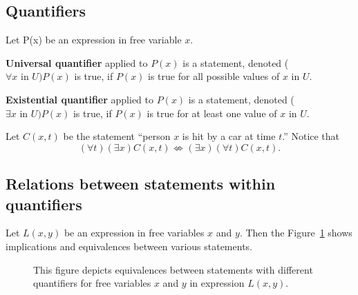 \documentclass[]{article}
\begin{document}
\subsection{Quantifiers}
Let P(x) be an expression in free variable $x$.
\begin{defn} \textbf{Universal quantifier} applied to $P(x)$ is a statement, denoted ($\forall x \text{ in } U)P(x)$ is true, if $P(x)$ is true for all possible values of $x$ in $U$.
\end{defn}
\begin{defn} \textbf{Existential quantifier} applied to $P(x)$ is a statement, denoted ($\exists x \text{ in }U)P(x)$ is true, if $P(x)$ is true for at least one value of $x$ in $U$.
\end{defn}
\begin{exmp} Let $C(x,t)$ be the statement ``person $x$ is hit by a car at time $t$.'' Notice that
\begin{equation*}
(\forall t)(\exists x) C(x,t) \not\Leftrightarrow (\exists x)(\forall t)C(x,t).
\end{equation*}
\end{exmp} 
\subsection{Relations between statements within quantifiers}
Let $L(x,y)$ be an expression in free variables $x$ and $y$. Then the Figure~\ref{Fig:Equivalences} shows implications and equivalences between various statements.
\begin{figure}[hhhh]
\centering
\scalebox{.8}{}
\caption{This figure depicts equivalences between statements with different quantifiers for free variables $x$ and $y$ in expression $L(x,y)$.}
\label{Fig:Equivalences}
\end{figure}

\end{document}
